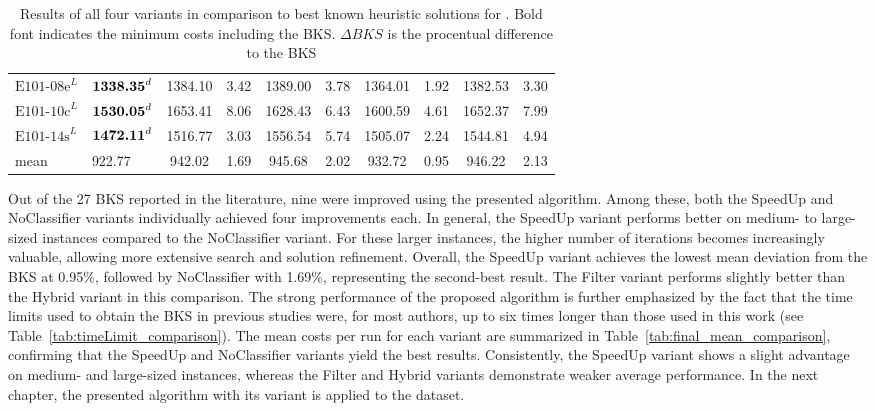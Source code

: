 \begin{table}[ht]
\begin{tabular}{@{}llcccccccc@{}}
        $\text{E101-08e}^L$ & $\text{\textbf{1338.35}}^d$ & 1384.10                          & 3.42                       & 1389.00                     & 3.78                       & 1364.01          & 1.92         & 1382.53         & 3.30         \\
        $\text{E101-10c}^L$ & $\text{\textbf{1530.05}}^d$ & 1653.41                          & 8.06                       & 1628.43                     & 6.43                       & 1600.59          & 4.61         & 1652.37         & 7.99         \\
        $\text{E101-14s}^L$ & $\text{\textbf{1472.11}}^d$ & 1516.77                          & 3.03                       & 1556.54                     & 5.74                       & 1505.07          & 2.24         & 1544.81         & 4.94         \\\midrule
        mean                & 922.77                      & 942.02                           & 1.69                       & 945.68                      & 2.02                       & 932.72           & 0.95         & 946.22          & 2.13         \\
        \bottomrule
    \end{tabular}
    \caption[Results of all four variants in comparison to best known heuristic solutions for \gendreauDataSet.]
    {Results of all four variants in comparison to best known heuristic solutions for \gendreauDataSet. Bold font indicates the
        minimum costs including the BKS. $\Delta BKS$ is the procentual difference to the BKS}
    \label{tab:final_best_results_gendreau}
\end{table}

Out of the 27 \gls{BKS} reported in the literature, nine were improved using the presented algorithm. Among these,
both the SpeedUp and NoClassifier variants individually achieved four improvements each. In general, the SpeedUp variant performs
better on medium- to large-sized instances compared to the NoClassifier variant. For these larger instances, the higher number of
iterations becomes increasingly valuable, allowing more extensive search and solution refinement.
Overall, the SpeedUp variant achieves the lowest mean deviation from the \gls{BKS} at 0.95\%, followed by NoClassifier with 1.69\%,
representing the second-best result. The Filter variant performs slightly better than the Hybrid variant in this comparison. The
strong performance of the proposed algorithm is further emphasized by the fact that the time limits used to obtain the \gls{BKS}
in previous studies were, for most authors, up to six times longer than those used in this work (see Table~\ref{tab:timeLimit_comparison}).
The mean costs per run for each variant are summarized in Table~\ref{tab:final_mean_comparison}, confirming that the SpeedUp
and NoClassifier variants yield the best results. Consistently, the SpeedUp variant shows a slight advantage on medium- and large-sized
instances, whereas the Filter and Hybrid variants demonstrate weaker average performance. In the next chapter, the presented
algorithm with its variant is applied to the \krebsADataSetText dataset.